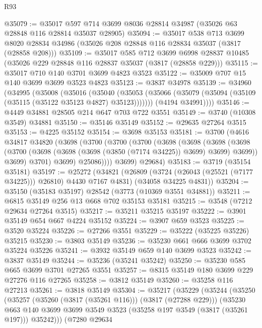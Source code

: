 \begin{lexlean}{R93}
\begin{coremodule}
@35079 := @35017 @597 @714 @3699 @8036 @28814 @34987 (@35026 @63 @28848 @116 @28814 @35037 @28905)
@35094 := @35017
    @538
    @713
    @3699
    @8020
    @28834
    @34986
    (@35026 @208 @28848 @116 @28834 @35037 (@3817 (@28858 @208)))
@35109 := @35017
    @585
    @712
    @3699
    @6998
    @28837
    @10485
    (@35026 @229 @28848 @116 @28837 @35037 (@3817 (@28858 @229)))
@35115 := @35017 @710 @140 @3701 @3699 @4823 @3523
@35122 := @35009 @707 @15 @140 @3699 @3699 @3523 @4823
@35123 := @3837 @34978
@35139 := @34960
    (@34995
      (@35008
        (@35016
          (@35040
            (@35053 (@35066 (@35079 (@35094 (@35109 (@35115 (@35122 @35123 @4827) @35123)))))))
          (@4194 @34991))))
@35146 := @4449 @34881 @28505 @214 @647 @703 @722 @3551
@35149 := @3740 (@10308 @3549) @34881
@35150 := @35146 @35149
@35152 := @29635 @27264 @3515
@35153 := @4225 @35152
@35154 := @3698 @35153
@35181 := @3700
    (@4616
      @34817
      @34820
      (@3698
        (@3700
          (@3700
            (@3700
              (@3698
                (@3698
                  (@3698
                    (@3698
                      (@3700 (@3698 (@3698 (@3698 (@3850 (@7174 @34225)) @3699) @3699) @3699))
                      @3699)
                    @3701)
                  @3699)
                @25086))))
        @3699)
      @29684)
@35183 := @3719 (@35154 @35181)
@35197 := @25272
    (@34821
      (@26809 (@3724 (@26043 (@25521 (@7177 @34225))) @26810) @4430 @7167 @4831)
      (@34058 @34225 @4831))
@35204 := @35150 (@35183 @35197) @28542 (@3773 (@10369 @3551 @34881))
@35211 := @6815 @35149 @256 @13 @668 @702 @35153 @35181
@35215 := @3548 (@7212 @29634 @27264 @3515)
@35217 := @35211 @35215 @35197
@35222 := @3901 @35149 @654 @667 @4224 @35152
@35224 := @3907 @659 @3523
@35225 := @3520 @35224
@35226 := @27266 @3551
@35229 := @35222 (@35225 @35226) @35215
@35230 := @3803 @35149
@35236 := @35230 @661 @666 @3699 @3702 @35224 @35226
@35241 := @3932 @35149 @659 @140 @3699 @3523
@35242 := @3837 @35149
@35244 := @35236 (@35241 @35242)
@35250 := @35230 @585 @665 @3699 @3701 @27265 @3551
@35257 := @8315 @35149 @180 @3699 @229 @27276 @116 @27265
@35258 := @3812 @35149
@35260 := @35258 @116 @27213
@35261 := @3818 @35149
@35304 := @35217
    (@35229
      (@35244
        (@35250
          (@35257 (@35260 (@3817 (@35261 @116))) (@3817 (@27288 @229)))
          (@35230
            @663
            @140
            @3699
            @3699
            @3549
            @3523
            (@35258 @197 @3549 (@3817 (@35261 @197)))
            @35242)))
      (@7280
        @29634

\end{coremodule}
\end{lexlean}
